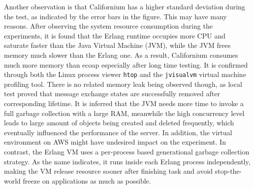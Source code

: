 Another observation is that Californium has a higher standard deviation during the test, as indicated by the error bars in the figure. This may have many reasons. After observing the system resource consumption during the experiments, it is found that the Erlang runtime occupies more CPU and saturate faster than the Java Virtual Machine (JVM), while the JVM frees memory much slower than the Erlang one. As a result, Californium consumes much more memory than ecoap especially after long time testing. It is confirmed through both the Linux process viewer \verb|htop| and the \verb|jvisualvm| \autocite{jvisualvm} virtual machine profiling tool. There is no related memory leak being observed though, as local test proved that message exchange states are successfully removed after corresponding lifetime. It is inferred that the JVM needs more time to invoke a full garbage collection with a large RAM, meanwhile the high concurrency level leads to large amount of objects being created and deleted frequently, which eventually influenced the performance of the server. In addition, the virtual environment on AWS might have undesired impact on the experiment. In contrast, the Erlang VM uses a per-process based generational garbage collection strategy. As the name indicates, it runs inside each Erlang process independently, making the VM release resource sooner after finishing task and avoid stop-the-world freeze on applications as much as possible. 

